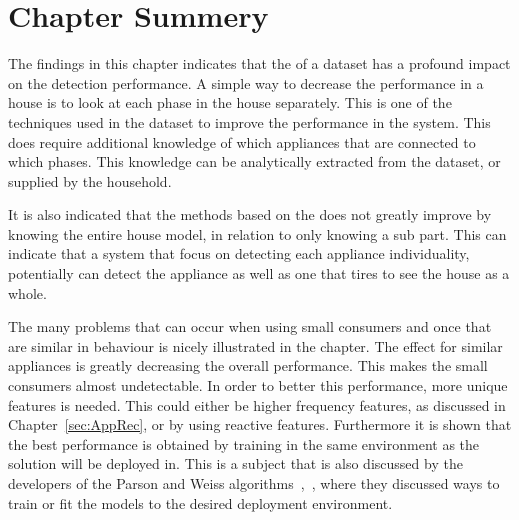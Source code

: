 \section{Chapter Summery}
The findings in this chapter indicates that the  of a dataset has a profound impact on the detection performance. A simple way to decrease the performance in a house is to look at each phase in the house separately. This is one of the techniques used in the  dataset to improve the performance in the system. This does require additional knowledge of which appliances that are connected to which phases. This knowledge can be analytically extracted from the dataset, or supplied by the household. 

It is also indicated that the methods based on the  does not greatly improve by knowing the entire house model, in relation to only knowing a sub part. This can indicate that a system that focus on detecting each appliance individuality, potentially can detect the appliance as well as one that tires to see the house as a whole.   

The many problems that can occur when using small consumers and once that are similar in behaviour is nicely illustrated in the chapter. The  effect for similar appliances is greatly decreasing the overall performance. This makes the small consumers almost undetectable. In order to better this performance, more unique features is needed. This could either be higher frequency features, as discussed in Chapter~\ref{sec:AppRec}, or by using reactive features. Furthermore it is shown that the best performance is obtained by training in the same environment as the solution will be deployed in. This is a subject that is also discussed by the developers of the Parson and Weiss algorithms~\citep{RefWorks:28},~\citep{RefWorks:23}, where they discussed ways to train or fit the models to the desired deployment environment.  